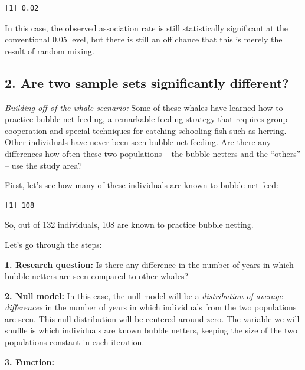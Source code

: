 \documentclass[
]{book}
\begin{document}
\begin{verbatim}
[1] 0.02
\end{verbatim}

In this case, the observed association rate is still statistically significant at the conventional 0.05 level, but there is still an off chance that this is merely the result of random mixing.

\hypertarget{are-two-sample-sets-significantly-different}{%
\subsection*{2. Are two sample sets significantly different?}\label{are-two-sample-sets-significantly-different}}

\emph{Building off of the whale scenario:} Some of these whales have learned how to practice bubble-net feeding, a remarkable feeding strategy that requires group cooperation and special techniques for catching schooling fish such as herring. Other individuals have never been seen bubble net feeding. Are there any differences how often these two populations -- the bubble netters and the ``others'' -- use the study area?

First, let's see how many of these individuals are known to bubble net feed:

\begin{verbatim}
[1] 108
\end{verbatim}

So, out of 132 individuals, 108 are known to practice bubble netting.

Let's go through the steps:

\textbf{1. Research question:} Is there any difference in the number of years in which bubble-netters are seen compared to other whales?

\textbf{2. Null model:} In this case, the null model will be a \emph{distribution of average differences} in the number of years in which individuals from the two populations are seen. This null distribution will be centered around zero. The variable we will shuffle is which individuals are known bubble netters, keeping the size of the two populations constant in each iteration.

\textbf{3. Function:}
\end{document}
